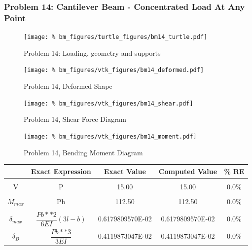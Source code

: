 \subsubsection{Problem 14: Cantilever Beam - Concentrated Load At Any Point}
\begin{figure}[h]
    \texttt{[image: \%
                            bm\_figures/turtle\_figures/bm14\_turtle.pdf]}
    \centering
    \caption{Problem 14: Loading, geometry and supports}
    \label{fig:bm14_turtle}
\end{figure}


\begin{figure}[!htb]
    \texttt{[image: \%
                     bm\_figures/vtk\_figures/bm14\_deformed.pdf]}
    \centering
    \caption{Problem 14, Deformed Shape}
    \label{fig:bm14_deformed}
\end{figure}
\begin{figure}[!htb]
    \texttt{[image: \%
                     bm\_figures/vtk\_figures/bm14\_shear.pdf]}
    \centering
    \caption{Problem 14, Shear Force Diagram}
    \label{fig:bm14_shear}
\end{figure}
\begin{figure}[!htb]
    \texttt{[image: \%
                     bm\_figures/vtk\_figures/bm14\_moment.pdf]}
    \centering
    \caption{Problem 14, Bending Moment Diagram}
    \label{fig:bm14_moment}
\end{figure}
\begin{table}[h!]
\centering
\begin{tabular}{ c| c c c c }
    & Exact Expression & Exact Value & Computed Value & \% RE \\ \hline \\
    V   & P & 15.00 & 15.00 & 0.0\% \\ \\
    $M_{max}$ & Pb & 112.50 & 112.50 & 0.0\% \\ \\
    $\delta_{max}$ & $\dfrac{Pb**2}{6EI}(3l-b)$ & 0.6179809570E-02 & 0.6179809570E-02 & 0.0\% \\
    $\delta_{B}$ & $\dfrac{Pb**3}{3EI}$ & 0.4119873047E-02 & 0.4119873047E-02 & 0.0\% \\
\end{tabular}
\end{table}

